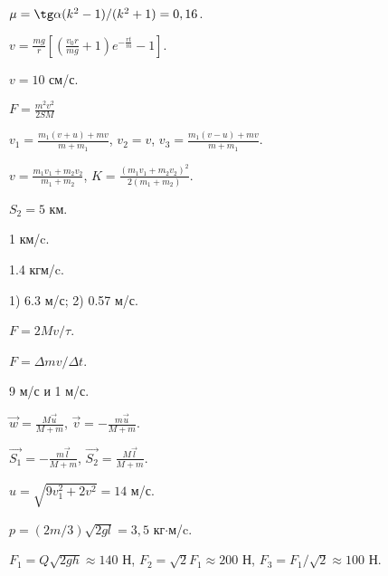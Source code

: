 \begin{Answer}{73}
$\mu = \tg \alpha (k^2-1)/(k^2+1) = 0,16$.
\end{Answer}
\begin{Answer}{74}
$v = \frac{mg}{r}\left[ \left( \frac{v_0r}{mg} +1 \right)e^{-\frac{rt}{m}} - 1 \right]$.
\end{Answer}
\begin{Answer}{75}
$v=10$ см/с.
\end{Answer}
\begin{Answer}{76}
$F = \frac{m^2 v^2}{2SM}$
\end{Answer}
\begin{Answer}{77}
$v_1 = \frac{m_1(v+u)+mv}{m+m_1}$, $v_2 = v$, $v_3 = \frac{m_1(v-u)+mv}{m+m_1}$.
\end{Answer}
\begin{Answer}{78}
$v = \frac{m_1v_1 + m_2v_2}{m_1+m_2}$, $K = \frac{(m_1v_1+m_2v_2)^2}{2(m_1+m_2)}$.
\end{Answer}
\begin{Answer}{79}
$S_2 = 5$ км.
\end{Answer}
\begin{Answer}{84}
1 км/c.
\end{Answer}
\begin{Answer}{85}
1.4 кгм/c.
\end{Answer}
\begin{Answer}{86}
1) 6.3 м/с; 2) 0.57 м/с.
\end{Answer}
\begin{Answer}{87}
$F = 2Mv/\tau$.
\end{Answer}
\begin{Answer}{88}
$F = \Delta m v/ \Delta t$.
\end{Answer}
\begin{Answer}{89}
9 м/с и 1 м/с.
\end{Answer}
\begin{Answer}{90}
$\vec{w} = \frac{M\vec{u}}{M+m}$, $\vec{v} = -\frac{m\vec{u}}{M+m}$.
\end{Answer}
\begin{Answer}{91}
$\vec{S_1} = -\frac{m\vec{l}}{M+m}$, $\vec{S_2} = \frac{M\vec{l}}{M+m}$.
\end{Answer}
\begin{Answer}{92}
$u = \sqrt{9v_{1}^2 + 2v^2} = 14$ м/с.
\end{Answer}
\begin{Answer}{93}
$p = (2m/3)\sqrt{2gl} = 3,5$ кг$\cdot$м/c.
\end{Answer}
\begin{Answer}{94}
$F_1 = Q\sqrt{2gh} \approx 140$ Н, $F_2 = \sqrt{2} F_1 \approx 200$ Н, $F_3 = F_1/\sqrt{2} \approx 100$ Н.
\end{Answer}
